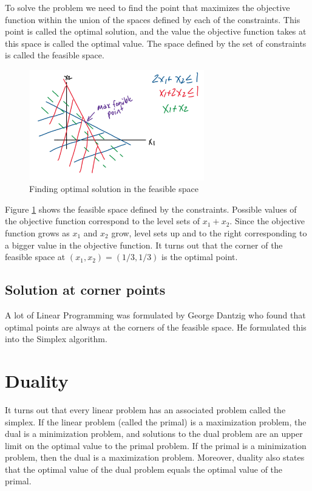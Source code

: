 \documentclass[twoside]{article}
\begin{document}
To solve the problem we need to find the point that maximizes the objective function within the union of the spaces defined by each of the constraints. This point is called the optimal solution, and the value the objective function takes at this space is called the optimal value. The space defined by the set of constraints is called the feasible space.

\begin{figure}[!ht]
  \includegraphics[width=3in]{LP_example.png}
  \caption{Finding optimal solution in the feasible space}
  \label{fig:lp_example}
\end{figure}

Figure \ref{fig:lp_example} shows the feasible space defined by the constraints. Possible values of the objective function correspond to the level sets of $x_1 + x_2$. Since the objective function grows as $x_1$ and $x_2$ grow, level sets up and to the right corresponding to a bigger value in the objective function. It turns out that the corner of the feasible space at $(x_1,x_2) = (1/3,1/3)$ is the optimal point. 

\subsection{Solution at corner points}
A lot of Linear Programming was formulated by George Dantzig who found that optimal points are always at the corners of the feasible space. He formulated this into the Simplex algorithm.

\section{Duality}
It turns out that every linear problem has an associated problem called the simplex. If the linear problem (called the primal) is a maximization problem, the dual is a minimization problem, and solutions to the dual problem are an upper limit on the optimal value to the primal problem. If the primal is a minimization problem, then the dual is a maximization problem.
Moreover, duality also states that the optimal value of the dual problem equals the optimal value of the primal.
\end{document}
